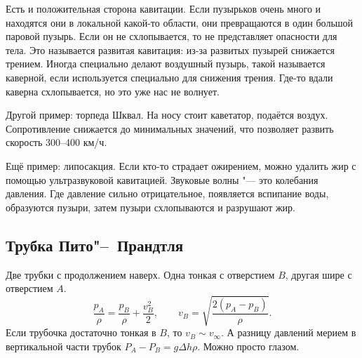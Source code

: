 Есть и положительная сторона кавитации. Если пузырьков очень много и находятся они в локальной какой-то области, они превращаются в один большой паровой пузырь. Если он не схлопывается, то не представляет опасности для тела. Это называется развитая кавитация: из-за развитых пузырей снижается трением. Иногда специально делают воздушный пузырь, такой называется каверной, если используется специально для снижения трения. Где-то вдали каверна схлопывается, но это уже нас не волнует.

Другой пример: торпеда Шквал. На носу стоит каветатор, подаётся воздух. Сопротивление снижается до минимальных значений, что позволяет развить скорость 300--400 км/ч.

Ещё пример: липосакция. Если кто-то страдает ожирением, можно удалить жир с помощью ультразвуковой кавитацией. Звуковые волны "--- это колебания давления. Где давление сильно отрицательное, появляется вспипание воды, образуются пузыри, затем пузыри схлопываются и разрушают жир.

\subsection{Трубка Пито"--~Прандтля}

Две трубки с продолжением наверх. Одна тонкая с отверстием $B$, другая шире с отверстием $A$.
\[\frac{p_A}\rho = \frac{p_B}\rho+\frac{v_B^2}2,\qquad v_B=\sqrt{\frac{2(p_A-p_B)}{\rho}}.\]
Если трубочка достаточно тонкая в $B$, то $v_B\sim v_\infty$. А разницу давлений мерием в вертикальной части трубок $P_A-P_B = g\Delta h\rho$. Можно просто глазом.

